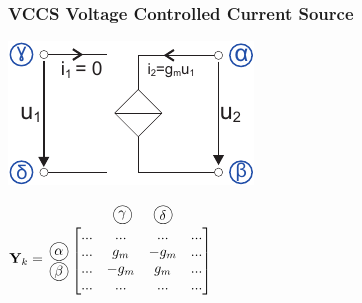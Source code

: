 \documentclass[a4paper,twocolumn,10pt]{article}
\newcommand*\kreis[1]{\unitlength1ex\begin{picture}(2.5,2.5)%
\put(0.75,0.75){\circle{3}}\put(0.7,0.7){\makebox(0,0){#1}}\end{picture}}
\begin{document}
\subsubsection*{VCCS Voltage Controlled Current Source}
\begin{minipage}[b]{0.20\textwidth}
\includegraphics[width=\textwidth]{Grafiken/KSA_USI}
\end{minipage}
\hfill
\begin{minipage}[b]{0.28\textwidth}
$\textbf{Y}_k=\;\;\begin{matrix}\begin{matrix} & & \;\;\;\kreis{$\gamma$} & \;\;\;\kreis{$\delta$} & \end{matrix}\\\begin{matrix} \; \\ \kreis{$\alpha$} \\ \kreis{$\beta$} \\ \; \end{matrix} \left[\begin{matrix} ... & ... & ... & ... \\ ... & g_m & -g_m & ... \\ ... & -g_m & g_m & ... \\ ...& ... & ... & ... \end{matrix}\right]\\ \; \end{matrix}$\\
\end{minipage}
\end{document}

